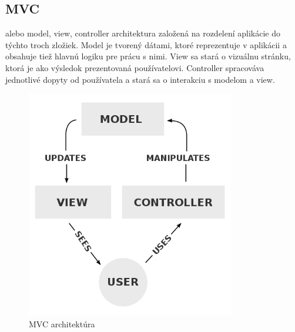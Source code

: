 \subsection{MVC} alebo model, view, controller architektura založená na rozdelení aplikácie do týchto troch zložiek. Model je tvorený dátami, ktoré reprezentuje v aplikácii a obsahuje tiež hlavnú logiku pre prácu s nimi. View sa stará o vizuálnu stránku, ktorá je ako výsledok prezentovaná používatelovi. Controller spracováva jednotlivé dopyty od používatela a stará sa o interakciu s modelom a view.
\begin{figure}[h]
  \centering
  \includegraphics[height=10cm]{mainmatter/imgs/mvc.png}
  \caption{MVC architektúra}
  \label{fig:comenius}
\end{figure}



